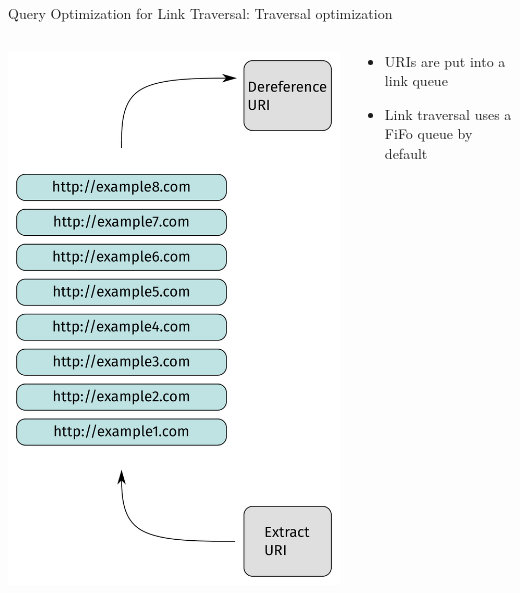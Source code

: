 \begin{frame}{Query Optimization for Link Traversal: Traversal optimization}
    \begin{columns}[T] %
        \begin{column}{0.55\textwidth} %
            \includegraphics[width=.80\linewidth]{images/link-queue.pdf} %
        \end{column}

        \begin{column}{0.4\textwidth}
            \begin{itemize}
                \item URIs are put into a link queue
                \item Link traversal uses a FiFo queue by default
            \end{itemize}
        \end{column}
    \end{columns}
\end{frame}


